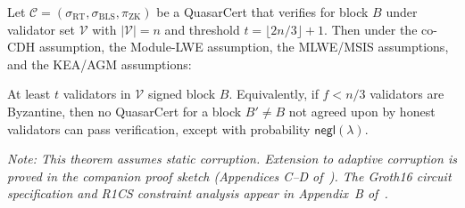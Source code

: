 \begin{theorem}
\label{thm:qcert-sound}
Let $\mathcal{C} = (\sigma_{\mathrm{RT}}, \sigma_{\mathrm{BLS}},
\pi_{\mathrm{ZK}})$ be a QuasarCert that verifies for block $B$ under
validator set $\mathcal{V}$ with $|\mathcal{V}| = n$ and threshold
$t = \lfloor 2n/3 \rfloor + 1$.  Then under the co-CDH assumption, the
Module-LWE assumption, the MLWE/MSIS assumptions, and the KEA/AGM
assumptions:

\medskip\noindent
At least $t$ validators in $\mathcal{V}$ signed block $B$.  Equivalently,
if $f < n/3$ validators are Byzantine, then no QuasarCert for a block
$B' \neq B$ not agreed upon by honest validators can pass verification,
except with probability $\mathsf{negl}(\lambda)$.

\medskip\noindent\textit{Note: This theorem assumes static corruption.
Extension to adaptive corruption is proved in the companion proof sketch
(Appendices C--D of~\cite{qcert-proof}).  The Groth16 circuit
specification and R1CS constraint analysis appear in Appendix~B
of~\cite{qcert-proof}.}
\end{theorem}

